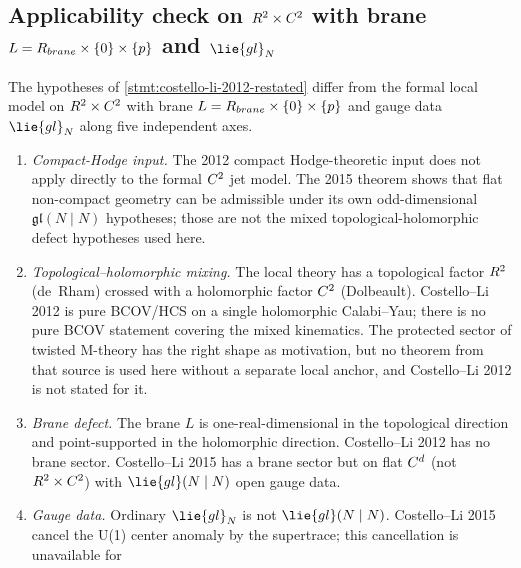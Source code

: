 \subsection*{Applicability check on \texorpdfstring{$R^2\times C^2$}{R2 x C2}
   with brane \texorpdfstring{$L=R_{brane}\times\{0\}\times\{p\}$}{L} and \texorpdfstring{$\lie{gl}_N$}{gl\_N}}

\begin{prop}\label{prop:costello-li-2012-hypothesis-separation}
  The hypotheses of \ref{stmt:costello-li-2012-restated} differ from
  the formal local model on $R^2\times C^2$ with brane
  \(L=R_{brane}\times\{0\}\times\{p\}\)
  and gauge data $\lie{gl}_N$ along five independent axes.

  \begin{enumerate}
    \item[(S1)] \emph{Compact-Hodge input.} The 2012 compact
      Hodge-theoretic input does not apply directly to the formal
      \(C^2\) jet model.  The 2015 theorem shows that flat
      non-compact geometry can be admissible under its own odd-dimensional
      \(\mathfrak{gl}(N\mid N)\) hypotheses; those are not the mixed
      topological-holomorphic defect hypotheses used here.
    \item[(S2)] \emph{Topological--holomorphic mixing.} The local
      theory has a topological factor $R^2$ (de~Rham) crossed with
      a holomorphic factor $C^2$ (Dolbeault). Costello--Li 2012 is
      pure BCOV/HCS on a single holomorphic Calabi--Yau; there is no
      pure BCOV statement covering the mixed kinematics. The
      protected sector of twisted M-theory \cite{costello-twistedM}
      has the right shape as motivation, but no theorem from that source
      is used here without a separate local anchor, and Costello--Li 2012
      is not stated for it.
    \item[(S3)] \emph{Brane defect.} The brane \(L\) is
      one-real-dimensional in the topological direction and
      point-supported in the holomorphic direction. Costello--Li
      2012 has no brane sector. Costello--Li 2015
      \cite{costello-li-open-closed-bcov} has a brane sector but on
      flat $C^d$ (not $R^2\times C^2$) with $\lie{gl}(N\mid N)$
      open gauge data.
    \item[(S4)] \emph{Gauge data.} Ordinary $\lie{gl}_N$ is not
      $\lie{gl}(N\mid N)$. Costello--Li 2015 cancel the U(1) center
      anomaly by the supertrace; this cancellation is unavailable for

\end{enumerate}
\end{prop}
